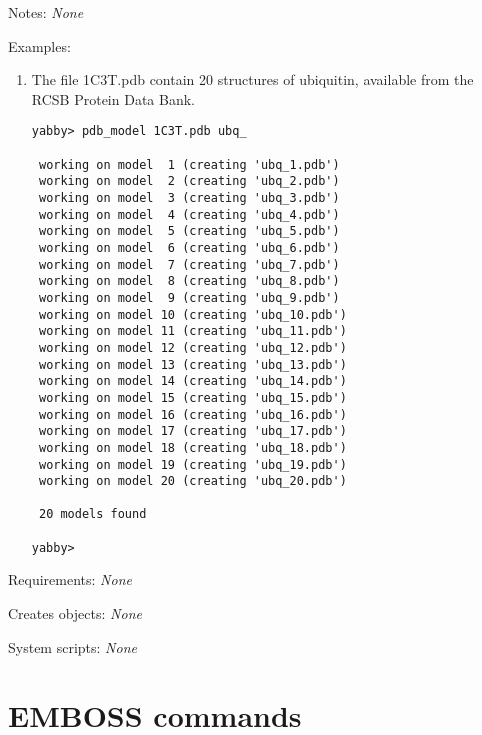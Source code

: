 \begin{description}

\item{Notes:} {\em None}


\item{Examples:}
\begin{enumerate}

\item The file 1C3T.pdb contain 20 structures of ubiquitin, available
from the RCSB Protein Data Bank.
\begin{verbatim}
yabby> pdb_model 1C3T.pdb ubq_

 working on model  1 (creating 'ubq_1.pdb')
 working on model  2 (creating 'ubq_2.pdb')
 working on model  3 (creating 'ubq_3.pdb')
 working on model  4 (creating 'ubq_4.pdb')
 working on model  5 (creating 'ubq_5.pdb')
 working on model  6 (creating 'ubq_6.pdb')
 working on model  7 (creating 'ubq_7.pdb')
 working on model  8 (creating 'ubq_8.pdb')
 working on model  9 (creating 'ubq_9.pdb')
 working on model 10 (creating 'ubq_10.pdb')
 working on model 11 (creating 'ubq_11.pdb')
 working on model 12 (creating 'ubq_12.pdb')
 working on model 13 (creating 'ubq_13.pdb')
 working on model 14 (creating 'ubq_14.pdb')
 working on model 15 (creating 'ubq_15.pdb')
 working on model 16 (creating 'ubq_16.pdb')
 working on model 17 (creating 'ubq_17.pdb')
 working on model 18 (creating 'ubq_18.pdb')
 working on model 19 (creating 'ubq_19.pdb')
 working on model 20 (creating 'ubq_20.pdb')

 20 models found

yabby>
\end{verbatim}

\end{enumerate}


\item{Requirements:} {\em None}


\item{Creates objects:} {\em None}


\item{System scripts:} {\em None}

\end{description}


\section{EMBOSS commands}

